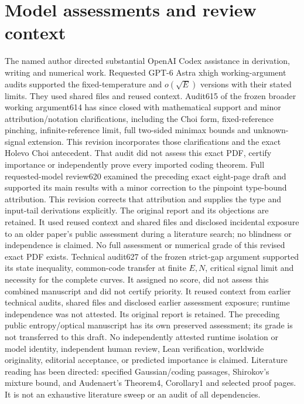 \documentclass[11pt]{article}
\begin{document}
\section*{Model assessments and review context}
The named author directed substantial OpenAI Codex assistance in
derivation, writing and numerical work.
Requested GPT-6 Astra xhigh working-argument audits supported the
fixed-temperature and \(o(\sqrt E)\) versions with their stated limits.
They used shared files and reused context.
Audit615 of the frozen broader working argument614 has since closed
with mathematical support and minor attribution/notation clarifications,
including the Choi form, fixed-reference pinching, infinite-reference
limit, full two-sided minimax bounds and unknown-signal extension.
This revision incorporates those clarifications and the exact Holevo
Choi antecedent. That audit did not assess this exact PDF, certify
importance or independently prove every imported coding theorem.
Full requested-model review620 examined the preceding exact eight-page
draft and supported its main results with a minor correction to the
pinpoint type-bound attribution. This revision corrects that attribution
and supplies the type and input-tail derivations explicitly.
The original report and its objections are retained.
It used reused context and shared files and disclosed incidental exposure
to an older paper's public assessment during a literature search;
no blindness or independence is claimed.
No full assessment or numerical grade of this revised exact PDF exists.
Technical audit627 of the frozen strict-gap argument supported its
state inequality, common-code transfer at finite \(E,N\), critical
signal limit and necessity for the complete curves.
It assigned no score, did not assess this combined manuscript and did
not certify priority. It reused context from earlier technical audits,
shared files and disclosed earlier assessment exposure; runtime
independence was not attested. Its original report is retained.
The preceding public entropy/optical manuscript has its own preserved
assessment; its grade is not transferred to this draft.
No independently attested runtime isolation or model identity,
independent human review, Lean verification, worldwide originality,
editorial acceptance, or predicted importance is claimed.
Literature reading has been directed: specified Gaussian/coding
passages, Shirokov's mixture bound, and Audenaert's Theorem4, Corollary1
and selected proof pages. It is not an exhaustive literature sweep
or an audit of all dependencies.
\end{document}
